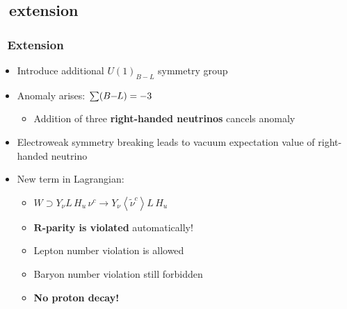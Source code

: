 \documentclass[10pt, svgnames]{beamer}
\begin{document}
\begin{frame}
\end{frame}

\subsection{\BMINUSL\ extension}

\begin{frame}
  \frametitle{\BMINUSL\ Extension}
  \UpdateFlag
  \begin{itemize}
    \item Introduce additional $U(1)_{B-L}$ symmetry group
    \item Anomaly arises: $\sum ( B \kern-0.25em - \kern-0.30em L ) = -3$
      \begin{itemize}
        \item Addition of three
          \textbf{\color{nice_blue} right-handed neutrinos} cancels anomaly
      \end{itemize}
    \item Electroweak symmetry breaking leads to vacuum expectation value of
      right-handed neutrino
    \item New term in Lagrangian:
      \begin{itemize}
        \item $ W \supset
          Y_{\nu} L\,H_{u}\, \nu^{c} \to 
          Y_{\nu} \left< \tilde{\nu}^{c} \right> L\,H_{u} $
        \item \textbf{\color{nice_blue} $\mathbf{R}$-parity is violated}
          automatically!
        \item Lepton number violation is allowed
        \item Baryon number violation still forbidden 
        \item \textbf{\color{nice_blue} No proton decay!}
      \end{itemize}
  \end{itemize}
\end{frame}
\end{document}
